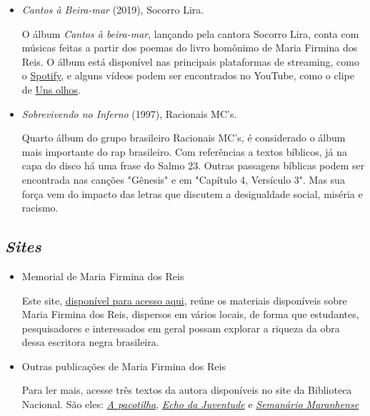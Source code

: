 \documentclass[12pt]{extarticle}
\begin{document}
\begin{itemize}
\item
\emph{Cantos à Beira-mar} (2019), Socorro Lira.

O álbum \emph{Cantos à beira-mar}, lançando pela cantora Socorro Lira, conta com músicas feitas a partir dos poemas do livro homônimo de Maria Firmina dos Reis. O álbum está disponível nas principais plataformas de streaming, como o \href{https://open.spotify.com/album/0sTj2fx0GaEFGLnDqMjAeJ}{Spotify}, e alguns vídeos podem ser encontrados no YouTube, como o clipe de \href{https://www.youtube.com/watch?v=utEg2Pm4dt4}{Uns olhos}.

\item \emph{Sobrevivendo no Inferno} (1997), Racionais MC's.

Quarto álbum do grupo brasileiro Racionais MC's, é considerado o álbum mais importante do rap brasileiro. Com referências a textos bíblicos, já na capa do disco há uma frase do Salmo 23. Outras passagens bíblicas podem ser encontrada nas canções "Gênesis" e em "Capítulo 4, Versículo 3". Mas sua força vem do impacto das letras que discutem a desigualdade social, miséria e racismo.

\end{itemize}

\subsection{\emph{Sites}}

\begin{itemize}
\item Memorial de Maria Firmina dos Reis

Este site, \href{https://mariafirmina.org.br/}{disponível para acesso aqui}, reúne os materiais disponíveis sobre Maria Firmina dos Reis, dispersos em vários locais, de forma que estudantes, pesquisadores e interessados em geral possam explorar a riqueza da obra dessa escritora negra brasileira.

\item Outras publicações de Maria Firmina dos Reis 

  Para ler mais, acesse três textos da autora disponíveis no site da
  Biblioteca Nacional. São eles: \href{http://memoria.bn.gov.br/docreader/DocReader.aspx?bib=168319_01\&pagfis=9008}{\emph{A pacotilha}}, \href{http://memoria.bn.gov.br/docreader/DocReader.aspx?bib=738271\&pagfis=48}{\emph{Echo da Juventude}} e \href{http://memoria.bn.gov.br/docreader/DocReader.aspx?bib=720097\&pagfis=214}{\emph{Semanário Maranhense}}
  \end{itemize}
\end{document}
